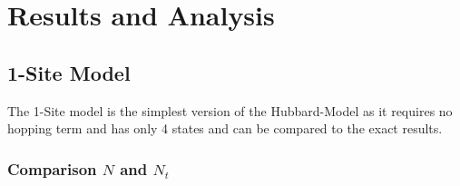 
\section{Results and Analysis}
\subsection{1-Site Model}
The 1-Site model is the simplest version of the Hubbard-Model as it requires no hopping term and has only 4 states and can be compared to the exact results.
\subsubsection{Comparison $N$ and $N_t$}
\begin{figure}[H]
	\begin{subfigure}[c]{0.5\textwidth}
		

\end{subfigure}
\end{figure}
